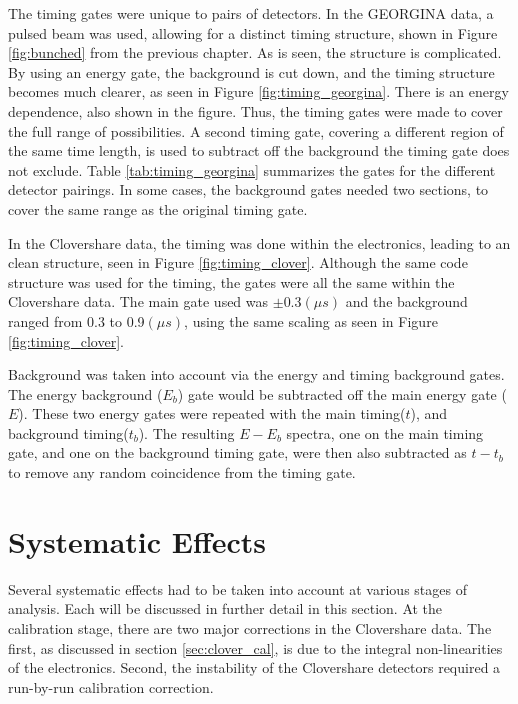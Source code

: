 The timing gates were unique to pairs of detectors. In the GEORGINA data, a pulsed beam was used, allowing for a distinct timing structure, shown in Figure \ref{fig:bunched} from the previous chapter. As is seen, the structure is complicated. By using an energy gate, the background is cut down, and the timing structure becomes much clearer, as seen in Figure \ref{fig:timing_georgina}. There is an energy dependence, also shown in the figure. Thus, the timing gates were made to cover the full range of possibilities. A second timing gate, covering a different region of the same time length, is used to subtract off the background the timing gate does not exclude. Table \ref{tab:timing_georgina} summarizes the gates for the different detector pairings. In some cases, the background gates needed two sections, to cover the same range as the original timing gate.

\afterpage{}



In the Clovershare data, the timing was done within the electronics, leading to an clean structure, seen in Figure \ref{fig:timing_clover}. Although the same code structure was used for the timing, the gates were all the same within the Clovershare data. The main gate used was $\pm0.3(\mu s)$ and the background ranged from 0.3 to 0.9$(\mu s)$, using the same scaling as seen in Figure \ref{fig:timing_clover}.



Background was taken into account via the energy and timing background gates. The energy background ($E_b$) gate would be subtracted off the main energy gate ($E$). These two energy gates were repeated with the main timing($t$), and background timing($t_b$). The resulting $E-E_b$ spectra, one on the main timing gate, and one on the background timing gate, were then also subtracted as $t-t_b$ to remove any random coincidence from the timing gate.

\section{Systematic Effects}

Several systematic effects had to be taken into account at various stages of analysis. Each will be discussed in further detail in this section. At the calibration stage, there are two major corrections in the Clovershare data. The first, as discussed in section \ref{sec:clover_cal}, is due to the integral non-linearities of the electronics. Second, the instability of the Clovershare detectors required a run-by-run calibration correction. 

